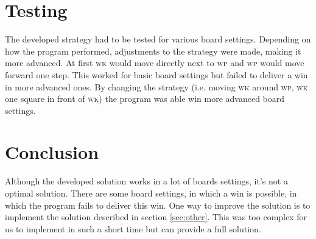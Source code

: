 \documentclass[titlepage,a4paper, 11pt]{article}
\newcommand{\wk}{\textsc{wk}\xspace}
\renewcommand{\wp}{\textsc{wp}\xspace}
\begin{document}
\section{Testing}
The developed strategy had to be tested for various board settings. Depending on how the program performed, 
adjustments to the strategy were made, making it more advanced. At first \wk would move directly next to \wp 
and \wp would move forward one step. This worked for basic board settings but failed to deliver a win in more 
advanced ones. By changing the strategy (i.e. moving \wk around \wp, \wk one square in front of \wk) the program 
was able win more advanced board settings.

\section{Conclusion}
Although the developed solution works in a lot of boards settings, it's not a optimal solution. There are some 
board settings, in which a win is possible, in which the program fails to deliver this win. One way to improve the solution 
is to implement the solution described in section \ref{sec:other}. This was too complex for us to implement in such 
a short time but can provide a full solution.
\end{document}
